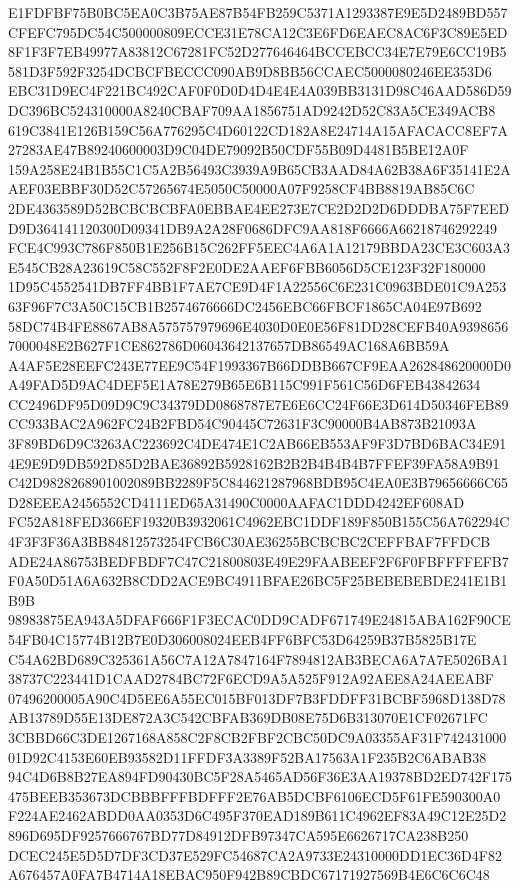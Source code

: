 \documentclass[UTF8,fontset=fandol,zihao=-4,a4paper]{ctexart}
\begin{document}
{{E1FDFBF75B0BC5EA0C3B75AE87B54FB259C5371A1293387E9E5D2489BD557CFEFC795DC54C500000809ECCE31E78CA12C3E6FD6EAEC8AC6F3C89E5ED
8F1F3F7EB49977A83812C67281FC52D277646464BCCEBCC34E7E79E6CC19B5581D3F592F3254DCBCFBECCC090AB9D8BB56CCAEC5000080246EE353D6
EBC31D9EC4F221BC492CAF0F0D0D4D4E4E4A039BB3131D98C46AAD586D59DC396BC524310000A8240CBAF709AA1856751AD9242D52C83A5CE349ACB8
619C3841E126B159C56A776295C4D60122CD182A8E24714A15AFACACC8EF7A27283AE47B89240600003D9C04DE79092B50CDF55B09D4481B5BE12A0F
159A258E24B1B55C1C5A2B56493C3939A9B65CB3AAD84A62B38A6F35141E2AAEF03EBBF30D52C57265674E5050C50000A07F9258CF4BB8819AB85C6C
2DE4363589D52BCBCBCBFA0EBBAE4EE273E7CE2D2D2D6DDDBA75F7EEDD9D364141120300D09341DB9A2A28F0686DFC9AA818F6666A66218746292249
FCE4C993C786F850B1E256B15C262FF5EEC4A6A1A12179BBDA23CE3C603A3E545CB28A23619C58C552F8F2E0DE2AAEF6FBB6056D5CE123F32F180000
1D95C4552541DB7FF4BB1F7AE7CE9D4F1A22556C6E231C0963BDE01C9A25363F96F7C3A50C15CB1B2574676666DC2456EBC66FBCF1865CA04E97B692
58DC74B4FE8867AB8A575757979696E4030D0E0E56F81DD28CEFB40A93986567000048E2B627F1CE862786D06043642137657DB86549AC168A6BB59A
A4AF5E28EEFC243E77EE9C54F1993367B66DDBB667CF9EAA262848620000D0A49FAD5D9AC4DEF5E1A78E279B65E6B115C991F561C56D6FEB43842634
CC2496DF95D09D9C9C34379DD0868787E7E6E6CC24F66E3D614D50346FEB89CC933BAC2A962FC24B2FBD54C90445C72631F3C90000B4AB873B21093A
3F89BD6D9C3263AC223692C4DE474E1C2AB66EB553AF9F3D7BD6BAC34E914E9E9D9DB592D85D2BAE36892B5928162B2B2B4B4B4B7FFEF39FA58A9B91
C42D9828268901002089BB2289F5C844621287968BDB95C4EA0E3B79656666C65D28EEEA2456552CD4111ED65A31490C0000AAFAC1DDD4242EF608AD
FC52A818FED366EF19320B3932061C4962EBC1DDF189F850B155C56A762294C4F3F3F36A3BB84812573254FCB6C30AE36255BCBCBC2CEFFBAF7FFDCB
ADE24A86753BEDFBDF7C47C21800803E49E29FAABEEF2F6F0FBFFFFEFB7F0A50D51A6A632B8CDD2ACE9BC4911BFAE26BC5F25BEBEBEBDE241E1B1B9B
98983875EA943A5DFAF666F1F3ECAC0DD9CADF671749E24815ABA162F90CE54FB04C15774B12B7E0D306008024EEB4FF6BFC53D64259B37B5825B17E
C54A62BD689C325361A56C7A12A7847164F7894812AB3BECA6A7A7E5026BA138737C223441D1CAAD2784BC72F6ECD9A5A525F912A92AEE8A24AEEABF
07496200005A90C4D5EE6A55EC015BF013DF7B3FDDFF31BCBF5968D138D78AB13789D55E13DE872A3C542CBFAB369DB08E75D6B313070E1CF02671FC
3CBBD66C3DE1267168A858C2F8CB2FBF2CBC50DC9A03355AF31F74243100001D92C4153E60EB93582D11FFDF3A3389F52BA17563A1F235B2C6ABAB38
94C4D6B8B27EA894FD90430BC5F28A5465AD56F36E3AA19378BD2ED742F175475BEEB353673DCBBBFFFBDFFF2E76AB5DCBF6106ECD5F61FE590300A0
F224AE2462ABDD0AA0353D6C495F370EAD189B611C4962EF83A49C12E25D2896D695DF9257666767BD77D84912DFB97347CA595E6626717CA238B250
DCEC245E5D5D7DF3CD37E529FC54687CA2A9733E24310000DD1EC36D4F82A676457A0FA7B4714A18EBAC950F942B89CBDC67171927569B4E6C6C6C48
}}
\end{document}
